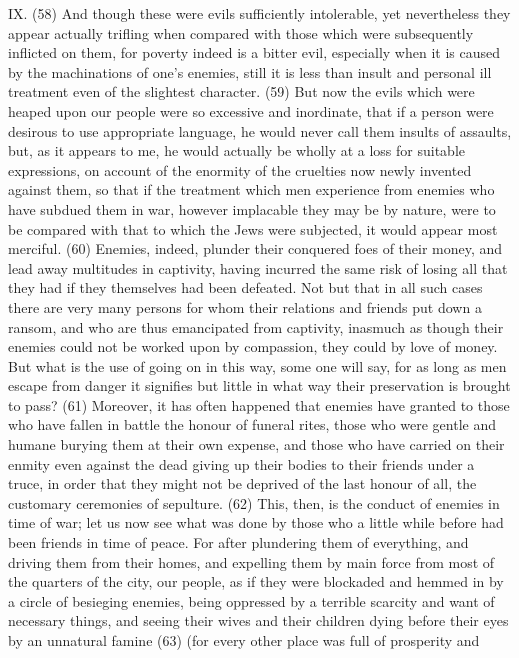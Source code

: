 IX. (58) And though these were evils sufficiently intolerable, yet nevertheless they appear actually
trifling when compared with those which were subsequently inflicted on them, for poverty indeed is
a bitter evil, especially when it is caused by the machinations of one's enemies, still it is less than
insult and personal ill treatment even of the slightest character. (59) But now the evils which were
heaped upon our people were so excessive and inordinate, that if a person were desirous to use
appropriate language, he would never call them insults of assaults, but, as it appears to me, he
would actually be wholly at a loss for suitable expressions, on account of the enormity of the
cruelties now newly invented against them, so that if the treatment which men experience from
enemies who have subdued them in war, however implacable they may be by nature, were to be
compared with that to which the Jews were subjected, it would appear most merciful. (60) Enemies,
indeed, plunder their conquered foes of their money, and lead away multitudes in captivity, having
incurred the same risk of losing all that they had if they themselves had been defeated. Not but that
in all such cases there are very many persons for whom their relations and friends put down a
ransom, and who are thus emancipated from captivity, inasmuch as though their enemies could not
be worked upon by compassion, they could by love of money. But what is the use of going on in this
way, some one will say, for as long as men escape from danger it signifies but little in what way
their preservation is brought to pass? (61) Moreover, it has often happened that enemies have
granted to those who have fallen in battle the honour of funeral rites, those who were gentle and
humane burying them at their own expense, and those who have carried on their enmity even
against the dead giving up their bodies to their friends under a truce, in order that they might not be
deprived of the last honour of all, the customary ceremonies of sepulture. (62) This, then, is the
conduct of enemies in time of war; let us now see what was done by those who a little while before
had been friends in time of peace. For after plundering them of everything, and driving them from
their homes, and expelling them by main force from most of the quarters of the city, our people, as
if they were blockaded and hemmed in by a circle of besieging enemies, being oppressed by a
terrible scarcity and want of necessary things, and seeing their wives and their children dying
before their eyes by an unnatural famine (63) (for every other place was full of prosperity and
